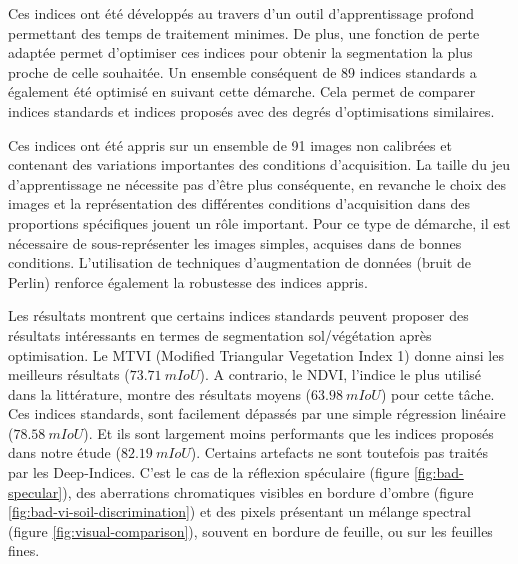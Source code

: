 \documentclass[../thesis.tex]{subfiles}
\begin{document}
    Ces indices ont été développés au travers d'un outil d'apprentissage profond permettant des temps de traitement minimes. De plus, une fonction de perte adaptée permet d'optimiser ces indices pour obtenir la segmentation la plus proche de celle souhaitée. Un ensemble conséquent de 89 indices standards a également été optimisé en suivant cette démarche. Cela permet de comparer indices standards et indices proposés avec des degrés d'optimisations similaires.
    
    Ces indices ont été appris sur un ensemble de 91 images non calibrées et contenant des variations importantes des conditions d'acquisition. La taille du jeu d'apprentissage ne nécessite pas d'être plus conséquente, en revanche le choix des images et la représentation des différentes conditions d'acquisition dans des proportions spécifiques jouent un rôle important. Pour ce type de démarche, il est nécessaire de sous-représenter les images simples, acquises dans de bonnes conditions. L'utilisation de techniques d'augmentation de données (bruit de Perlin) renforce également la robustesse des indices appris. %
    
    Les résultats montrent que certains indices standards peuvent proposer des résultats intéressants en termes de segmentation sol/végétation après optimisation. Le MTVI (Modified Triangular Vegetation Index 1) donne ainsi les meilleurs résultats ($\SI{73.71}{mIoU}$). A contrario, le NDVI, l'indice le plus utilisé dans la littérature, montre des résultats moyens ($\SI{63.98}{mIoU}$) pour cette tâche. Ces indices standards, sont facilement dépassés par une simple régression linéaire ($\SI{78.58}{mIoU}$). Et ils sont largement moins performants que les indices proposés dans notre étude ($\SI{82.19}{mIoU}$). %
    Certains artefacts ne sont toutefois pas traités par les Deep-Indices. C'est le cas de la réflexion spéculaire (figure \ref{fig:bad-specular}), des aberrations chromatiques visibles en bordure d'ombre (figure \ref{fig:bad-vi-soil-discrimination}) et des pixels présentant un mélange spectral (figure \ref{fig:visual-comparison}), souvent en bordure de feuille, ou sur les feuilles fines.
    
    
\end{document}
